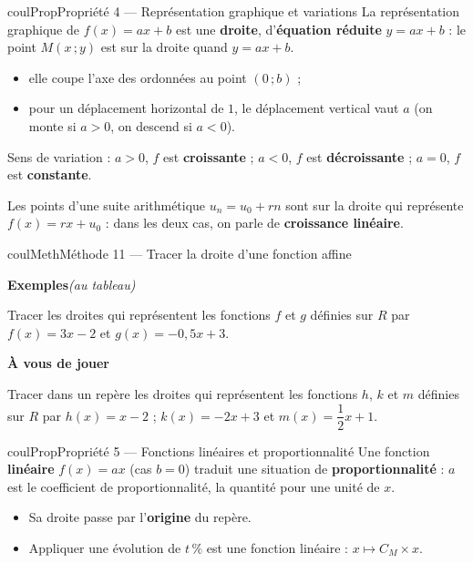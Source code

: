 \documentclass[11pt,a4paper]{article}
\makeatletter
\newcommand{\R}{\mathbb{R}}
\newcommand{\N}{\mathbb{N}}
\newcommand{\Z}{\mathbb{Z}}
\newcommand{\Q}{\mathbb{Q}}
\newcommand{\vect}[1]{\overrightarrow{#1}}
\newcommand{\fois}[1]{\times{\color{coulExo}#1}}
\providecommand{\Cf}{\mathcal{C}\sb{f}}%
\providecommand{\Cg}{\mathcal{C}\sb{g}}%
\newcounter{lycee@signet}
\newcommand{\signet}[3][]{\stepcounter{lycee@signet}%
  \edef\lycee@dest{\if\relax\detokenize{#1}\relax
    signet.\arabic{lycee@signet}\else#1\fi}%
  \hypertarget{\lycee@dest}{}\bookmark[level=#2,dest=\lycee@dest]{#3}}
\def\R{R}\def\N{N}\def\Z{Z}\def\Q{Q}\def\vect#1{#1}\def\Cf{Cf}\def\Cg{Cg}\def\fois#1{×#1}%
\newcounter{methode}
\newenvironment{proprietebox}[1][Propriété]%
  {\begin{boitecours}[phantom={\signet{2}{#1}}]{coulProp}{#1}}{\end{boitecours}}
\newenvironment{methodebox}[1][Méthode]{\stepcounter{methode}%
  \begin{boitecours}[phantom={\signet[methode-\arabic{methode}]{2}{#1}}]{coulMeth}{#1}}%
  {\end{boitecours}}
\newcommand{\etape}[1]{\par\smallskip\textbf{\color{coulMeth}#1}\par\nobreak\smallskip}
\newcommand{\autableau}{\hfill{\footnotesize\itshape\color{black!45}(au tableau)}}
\newcommand{\etapeexemples}{%
    \par\smallskip\textbf{\color{coulMeth}Exemples}\autableau\par\nobreak\smallskip}
\makeatother
\begin{document}
\begin{proprietebox}[Propriété 4 --- Représentation graphique et variations]
La représentation graphique de $f(x)=ax+b$ est une \textbf{droite}, d'\textbf{équation
réduite} $\boxed{y=ax+b}$ : le point $M(x\,;y)$ est sur la droite quand $y=ax+b$.
\begin{itemize}
  \item elle coupe l'axe des ordonnées au point $(0\,;b)$ ;
  \item pour un déplacement horizontal de $1$, le déplacement vertical vaut $a$ (on
        monte si $a>0$, on descend si $a<0$).
\end{itemize}
Sens de variation : $a>0$, $f$ est \textbf{croissante} ; $a<0$, $f$ est
\textbf{décroissante} ; $a=0$, $f$ est \textbf{constante}.
\end{proprietebox}

\begin{remarquebox}
Les points d'une suite arithmétique $u_{n}=u_{0}+rn$ sont sur la droite qui représente
$f(x)=rx+u_{0}$ : dans les deux cas, on parle de \textbf{croissance linéaire}.
\end{remarquebox}

\begin{methodebox}[Méthode 11 --- Tracer la droite d'une fonction affine]
\etapeexemples
Tracer les droites qui représentent les fonctions $f$ et $g$ définies sur $\R$ par
$f(x)=3x-2$ et $g(x)=-0{,}5x+3$.

\etape{À vous de jouer}
Tracer dans un repère les droites qui représentent les fonctions $h$, $k$ et $m$ définies
sur $\R$ par $h(x)=x-2$ ; $k(x)=-2x+3$ et $m(x)=\dfrac{1}{2}x+1$.

\end{methodebox}

\begin{proprietebox}[Propriété 5 --- Fonctions linéaires et proportionnalité]
Une fonction \textbf{linéaire} $f(x)=ax$ (cas $b=0$) traduit une situation de
\textbf{proportionnalité} : $a$ est le coefficient de proportionnalité, la quantité
pour une unité de $x$.
\begin{itemize}
  \item Sa droite passe par l'\textbf{origine} du repère.
  \item Appliquer une évolution de $t\,\%$ est une fonction linéaire :
        $x\mapsto C_{M}\times x$.
\end{itemize}
\end{proprietebox}
\end{document}
